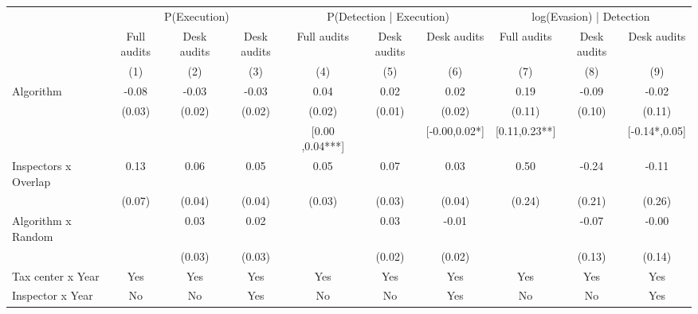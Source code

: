 \begin{tabular}{lccc|ccc|ccc} \toprule
\multicolumn{1}{l}{} & \multicolumn{3}{c}{P(Execution)} & \multicolumn{3}{c}{P(Detection | Execution)} & \multicolumn{3}{c}{log(Evasion) | Detection} \\\cmidrule(lr){2-4}\cmidrule(lr){5-7}\cmidrule(lr){8-10} \multicolumn{1}{l}{} & Full audits & Desk audits & Desk audits & Full audits & Desk audits & Desk audits & Full audits & Desk audits & Desk audits \\ \multicolumn{1}{l}{} & (1) & (2) & (3) & (4) & (5) & (6) & (7) & (8) & (9) \\ \midrule
Algorithm   &       -0.08\sym{**} &       -0.03\sym{*}  &       -0.03\sym{*}  &        0.04\sym{**} &        0.02         &        0.02         &        0.19\sym{*}  &       -0.09         &       -0.02         \\
            &      (0.03)         &      (0.02)         &      (0.02)         &      (0.02)         &      (0.01)         &      (0.02)         &      (0.11)         &      (0.10)         &      (0.11)         \\
\addlinespace
 & & & & [0.00 ,0.04***] & & [-0.00,0.02*] & [0.11,0.23**] & & [-0.14*,0.05] \\  Inspectors x Overlap&        0.13\sym{**} &        0.06         &        0.05         &        0.05\sym{*}  &        0.07\sym{**} &        0.03         &        0.50\sym{**} &       -0.24         &       -0.11         \\
            &      (0.07)         &      (0.04)         &      (0.04)         &      (0.03)         &      (0.03)         &      (0.04)         &      (0.24)         &      (0.21)         &      (0.26)         \\
\addlinespace
Algorithm x Random&                     &        0.03         &        0.02         &                     &        0.03         &       -0.01         &                     &       -0.07         &       -0.00         \\
            &                     &      (0.03)         &      (0.03)         &                     &      (0.02)         &      (0.02)         &                     &      (0.13)         &      (0.14)         \\
\midrule
Tax center x Year&         Yes         &         Yes         &         Yes         &         Yes         &         Yes         &         Yes         &         Yes         &         Yes         &         Yes         \\
Inspector x Year&          No         &          No         &         Yes         &          No         &          No         &         Yes         &          No         &          No         &         Yes         \\

\end{tabular}
